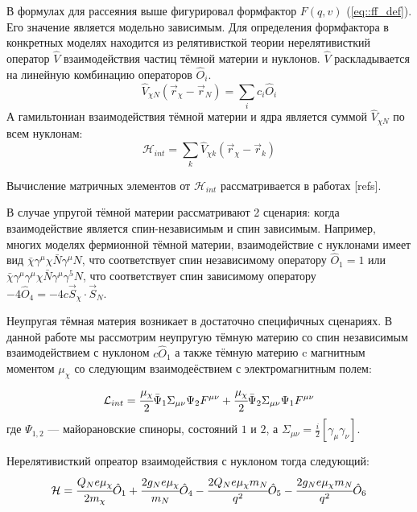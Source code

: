В формулах для рассеяния выше фигурировал формфактор $F(q,v)$ (\ref{eq::ff_def}). Его значение является модельно зависимым. Для определения формфактора в конкретных моделях находится из релятивисткой теории нерелятивисткий оператор $\hat{V}$ взаимодействия частиц тёмной материи и нуклонов.
$\hat{V}$ раскладывается на линейную комбинацию операторов $\hat{O}_i$.
\begin{equation}
	\hat{V}_{\chi N}(\vec{r}_{\chi} - \vec{r}_{N}) = \sum_i{c_i \hat{O}_i} 
\end{equation}
А гамильтониан взаимодействия тёмной материи и ядра является суммой $\hat{V}_{\chi N}$ по всем нуклонам:
\begin{equation}
	\mathcal{H}_{int} = \sum_{k}{\hat{V}_{\chi k}(\vec{r}_{\chi} - \vec{r}_{k})} 
\end{equation}

Вычисление матричных элементов от $\mathcal{H}_{int}$ рассматривается в работах [refs]. 

В случае упругой тёмной материи рассматривают 2 сценария: когда взаимодействие является спин-независимым и спин зависимым. 
Например, многих моделях фермионной тёмной материи, взаимодействие с нуклонами имеет вид $\bar{\chi}\gamma^{\mu}\chi \bar{N}\gamma^{\mu}N$, что соответствует спин независимому оператору $\hat{O}_1 = 1$ или $\bar{\chi}\gamma^{\mu}\gamma^{\mu}\chi \bar{N}\gamma^{\mu}\gamma^{5}N$, что соответствует спин зависимому оператору $-4\hat{O}_4 = -4c \vec{S}_{\chi}\cdot\vec{S}_{N}$.

Неупругая тёмная материя возникает в достаточно специфичных сценариях. В данной работе мы рассмотрим неупругую тёмную материю со спин независимым взаимодействием с нуклоном $c \hat{O}_1$ а также тёмную материю c магнитным моментом $\mu_{\chi}$ со следующим взаимодеёствием с электромагнитным полем:
	\begin{equation*}
	\mathcal{L}_{int} = \cfrac{\mu_{\chi}}{2} \bar{\Psi}_1 \Sigma_{\mu\nu} \Psi_2 F^{\mu\nu} + \cfrac{\mu_{\chi}}{2} \bar{\Psi}_2 \Sigma_{\mu\nu} \Psi_1 F^{\mu\nu} 
\end{equation*}
где ${\Psi}_{1,2}$ --- майорановские спиноры, состояний $1$ и $2$, а $\Sigma_{\mu\nu} = \frac{i}{2}[\gamma_{\mu}\gamma_{\nu}]$.

Нерелятивисткий опреатор взаимодействия с нуклоном тогда следующий:
\begin{equation}
	\mathcal{H} = 
	\cfrac{Q_N e\mu_{\chi}}{2m_{\chi}} \hat{O}_1 + 
	\cfrac{2g_N e\mu_{\chi}}{m_{N}} \hat{O}_4-
	\cfrac{2Q_N e\mu_{\chi} m_{N} }{q^2} \hat{O}_5 -
	\cfrac{2g_N e\mu_{\chi} m_{N}}{q^2} \hat{O}_6
\end{equation}

